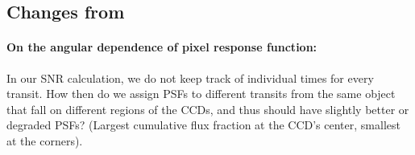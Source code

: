 \begin{appendices}

\newpage
\clearpage
\pagebreak
\section{Changes from~\citet{Sullivan_2015}}
\label{sec:changes_from_S15}
\paragraph{On the angular dependence of \tesss pixel response function:} 
In our SNR calculation, we do not keep track of individual times for every transit. 
How then do we assign PSFs to different transits from the same object that fall on different regions of the CCDs, and thus should have slightly better or degraded PSFs? (Largest cumulative flux fraction at the CCD's center, smallest at the corners). 


\end{appendices}
